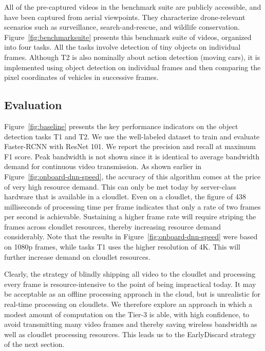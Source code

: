 All of the pre-captured videos in the benchmark suite are publicly accessible,
and have been captured from aerial viewpoints. They characterize drone-relevant
scenarios such as surveillance, search-and-rescue, and wildlife conservation.
Figure~\ref{fig:benchmarksuite} presents this benchmark suite of videos,
organized into four tasks. All the tasks involve detection of tiny objects on
individual frames. Although T2 is also nominally about action detection (moving
cars), it is implemented using object detection on individual frames and then
comparing the pixel coordinates of vehicles in successive frames.

\subsection{Evaluation}
\label{sec:dumbdrone-results}

Figure~\ref{fig:baseline} presents the key performance indicators on the object
detection tasks T1 and T2. We use the well-labeled dataset to train and evaluate
Faster-RCNN with ResNet 101. We report the precision and recall at maximum F1
score.  Peak bandwidth is not shown since it is identical to average bandwidth
demand for continuous video transmission.  As shown earlier in
Figure~\ref{fig:onboard-dnn-speed}, the accuracy of this algorithm comes at the
price of very high resource demand.  This can only be met today by server-class
hardware that is available in a cloudlet.  Even on a cloudlet, the figure of 438
milliseconds of processing time per frame indicates that only a rate of two
frames per second is achievable.  Sustaining a higher frame rate will require
striping the frames across cloudlet resources, thereby increasing resource
demand considerably.  Note that the results in
Figure~\ref{fig:onboard-dnn-speed} were based on 1080p frames, while tasks T1
uses the higher resolution of 4K. This will further increase demand on cloudlet
resources.

Clearly, the strategy of blindly shipping all video to the cloudlet
and processing every frame is resource-intensive to the point of being
impractical today.  It may be acceptable as an offline processing
approach in the cloud, but is unrealistic for real-time processing on
cloudlets.  We therefore explore an approach in which a modest amount
of computation on the Tier-3 is able, with high confidence, to avoid
transmitting many video frames and thereby saving wireless bandwidth
as well as cloudlet processing resources.  This leads us to the {\xc
  EarlyDiscard} strategy of the next section.



